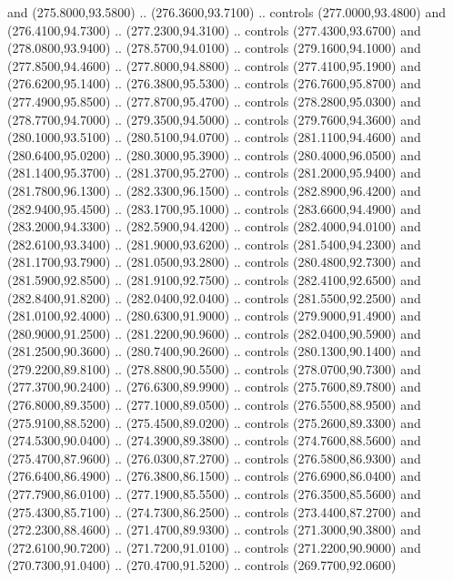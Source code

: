 {\begin{scope}[y=0.80pt, x=0.80pt, yscale=-1, xscale=1, inner sep=0pt, outer sep=0pt, #1]
      and (275.8000,93.5800) .. (276.3600,93.7100) .. controls (277.0000,93.4800)
      and (276.4100,94.7300) .. (277.2300,94.3100) .. controls (277.4300,93.6700)
      and (278.0800,93.9400) .. (278.5700,94.0100) .. controls (279.1600,94.1000)
      and (277.8500,94.4600) .. (277.8000,94.8800) .. controls (277.4100,95.1900)
      and (276.6200,95.1400) .. (276.3800,95.5300) .. controls (276.7600,95.8700)
      and (277.4900,95.8500) .. (277.8700,95.4700) .. controls (278.2800,95.0300)
      and (278.7700,94.7000) .. (279.3500,94.5000) .. controls (279.7600,94.3600)
      and (280.1000,93.5100) .. (280.5100,94.0700) .. controls (281.1100,94.4600)
      and (280.6400,95.0200) .. (280.3000,95.3900) .. controls (280.4000,96.0500)
      and (281.1400,95.3700) .. (281.3700,95.2700) .. controls (281.2000,95.9400)
      and (281.7800,96.1300) .. (282.3300,96.1500) .. controls (282.8900,96.4200)
      and (282.9400,95.4500) .. (283.1700,95.1000) .. controls (283.6600,94.4900)
      and (283.2000,94.3300) .. (282.5900,94.4200) .. controls (282.4000,94.0100)
      and (282.6100,93.3400) .. (281.9000,93.6200) .. controls (281.5400,94.2300)
      and (281.1700,93.7900) .. (281.0500,93.2800) .. controls (280.4800,92.7300)
      and (281.5900,92.8500) .. (281.9100,92.7500) .. controls (282.4100,92.6500)
      and (282.8400,91.8200) .. (282.0400,92.0400) .. controls (281.5500,92.2500)
      and (281.0100,92.4000) .. (280.6300,91.9000) .. controls (279.9000,91.4900)
      and (280.9000,91.2500) .. (281.2200,90.9600) .. controls (282.0400,90.5900)
      and (281.2500,90.3600) .. (280.7400,90.2600) .. controls (280.1300,90.1400)
      and (279.2200,89.8100) .. (278.8800,90.5500) .. controls (278.0700,90.7300)
      and (277.3700,90.2400) .. (276.6300,89.9900) .. controls (275.7600,89.7800)
      and (276.8000,89.3500) .. (277.1000,89.0500) .. controls (276.5500,88.9500)
      and (275.9100,88.5200) .. (275.4500,89.0200) .. controls (275.2600,89.3300)
      and (274.5300,90.0400) .. (274.3900,89.3800) .. controls (274.7600,88.5600)
      and (275.4700,87.9600) .. (276.0300,87.2700) .. controls (276.5800,86.9300)
      and (276.6400,86.4900) .. (276.3800,86.1500) .. controls (276.6900,86.0400)
      and (277.7900,86.0100) .. (277.1900,85.5500) .. controls (276.3500,85.5600)
      and (275.4300,85.7100) .. (274.7300,86.2500) .. controls (273.4400,87.2700)
      and (272.2300,88.4600) .. (271.4700,89.9300) .. controls (271.3000,90.3800)
      and (272.6100,90.7200) .. (271.7200,91.0100) .. controls (271.2200,90.9000)
      and (270.7300,91.0400) .. (270.4700,91.5200) .. controls (269.7700,92.0600)

\end{scope}}
